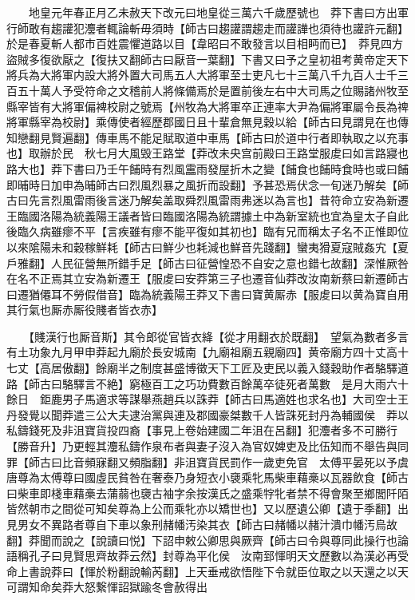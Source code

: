 　　地皇元年春正月乙未赦天下改元曰地皇從三萬六千歲歷號也　莽下書曰方出軍行師敢有趨讙犯灋者輒論斬毋須時【師古曰趨讙謂趨走而讙譁也須待也讙許元翻】於是春夏斬人都市百姓震懼道路以目【韋昭曰不敢發言以目相眄而已】　莽見四方盜賊多復欲厭之【復扶又翻師古曰厭音一葉翻】下書又曰予之皇初祖考黄帝定天下將兵為大將軍内設大將外置大司馬五人大將軍至士吏凡七十三萬八千九百人士千三百五十萬人予受符命之文稽前人將條備焉於是置前後左右中大司馬之位賜諸州牧至縣宰皆有大將軍偏裨校尉之號焉【州牧為大將軍卒正連率大尹為偏將軍屬令長為禆將軍縣宰為校尉】乘傳使者經歷郡國日且十輩倉無見穀以給【師古曰見謂見在也傳知戀翻見賢遍翻】傳車馬不能足賦取道中車馬【師古曰於道中行者即執取之以充事也】取辦於民　秋七月大風毁王路堂【莽改未央宫前殿曰王路堂服䖍曰如言路寢也路大也】莽下書曰乃壬午餔時有烈風靁雨發屋折木之變【餔食也餔時食時也或曰餔即晡時日加申為晡師古曰烈風烈暴之風折而設翻】予甚恐焉伏念一旬迷乃解矣【師古曰先言烈風雷雨後言迷乃解矣盖取舜烈風雷雨弗迷以為言也】昔符命立安為新遷王臨國洛陽為統義陽王議者皆曰臨國洛陽為統謂據土中為新室統也宜為皇太子自此後臨久病雖瘳不平【言疾雖有瘳不能平復如其初也】臨有兄而稱太子名不正惟即位以來隂陽未和穀稼鮮耗【師古曰鮮少也耗減也鮮音先踐翻】蠻夷猾夏寇賊姦宄【夏戶雅翻】人民征營無所錯手足【師古曰征營惶恐不自安之意也錯七故翻】深惟厥咎在名不正焉其立安為新遷王【服䖍曰安莽第三子也遷音仙莽改汝南新蔡曰新遷師古曰遷猶僊耳不勞假借音】臨為統義陽王莽又下書曰寶黄厮赤【服䖍曰以黄為寶自用其行氣也厮赤厮役賤者皆衣赤】

　　【賤漢行也厮音斯】其令郎從官皆衣絳【從才用翻衣於既翻】　望氣為數者多言有土功象九月甲申莽起九廟於長安城南【九廟祖廟五親廟四】黄帝廟方四十丈高十七丈【高居傲翻】餘廟半之制度甚盛博徵天下工匠及吏民以義入錢穀助作者駱驛道路【師古曰駱驛言不絶】窮極百工之巧功費數百餘萬卒徒死者萬數　是月大雨六十餘日　鉅鹿男子馬適求等謀舉燕趙兵以誅莽【師古曰馬適姓也求名也】大司空士王丹發覺以聞莽遣三公大夫逮治黨與連及郡國豪桀數千人皆誅死封丹為輔國侯　莽以私鑄錢死及非沮寶貨投四裔【事見上卷始建國二年沮在呂翻】犯灋者多不可勝行【勝音升】乃更輕其灋私鑄作泉布者與妻子沒入為官奴婢吏及比伍知而不舉告與同罪【師古曰比音頻寐翻又頻脂翻】非沮寶貨民罰作一歲吏免官　太傅平晏死以予虞唐尊為太傅尊曰國虛民貧咎在奢泰乃身短衣小褏乘牝馬柴車藉槀以瓦器飲食【師古曰柴車即棧車藉槀去蒲蒻也褏古袖字余按漢氏之盛乘牸牝者禁不得會聚至鄉閭阡陌皆然朝市之間從可知矣尊為上公而乘牝亦以矯世也】又以歷遺公卿【遺于季翻】出見男女不異路者尊自下車以象刑赭幡汚染其衣【師古曰赭幡以赭汁潰巾幡汚烏故翻】莽聞而說之【說讀曰悦】下詔申敕公卿思與厥齊【師古曰令與尊同此操行也論語稱孔子曰見賢思齊故莽云然】封尊為平化侯　汝南郅惲明天文歷數以為漢必再受命上書說莽曰【惲於粉翻說輸芮翻】上天垂戒欲悟陛下令就臣位取之以天還之以天可謂知命矣莽大怒繋惲詔獄踰冬會赦得出

